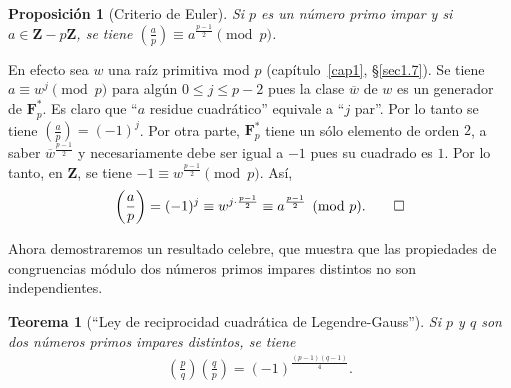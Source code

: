 \documentclass[bibtotoc,leqno,spanish]{amsbook}
\newcommand{\ZZ}{\mathbf{Z}}
\newcommand{\FF}{\mathbf{F}}
\newcommand{\oline}[1]{\overline{#1}}
\newcommand{\leg}[2]{\left(\frac{#1}{#2}\right)}
\numberwithin{equation}{section}
\theoremstyle{note}
\theoremstyle{note}
\newtheorem{theorem}{Teorema}
\newtheorem{proposition}{Proposici\'on}
\theoremstyle{rem}
\numberwithin{theorem}{section}
\numberwithin{proposition}{section}
\numberwithin{definition}{section}
\numberwithin{lemma}{section}
\numberwithin{corollary}{section}
\numberwithin{example}{section}
\numberwithin{footnote}{section}%
\begin{document}
\begin{proposition}[Criterio de Euler]\label{prop5.5.1}
Si $p$ es un n\'umero primo impar y si $a\in\ZZ-p\ZZ$, se tiene $\leg{a}{p}\equiv a^{\frac{p-1}{2}}\pmod p$.
\end{proposition}

En efecto sea $w$ una ra\'iz primitiva mod $p$ (cap\'itulo~\ref{cap1}, \S\ref{sec1.7}). Se tiene
$a\equiv w^{j}\pmod p$ para alg\'un $0\leq j\leq p-2$ pues la clase $\oline w$ de $w$ es un generador
de $\FF_{p}^{*}$. Es claro que ``$a$ residue cuadr\'atico'' equivale a ``$j$ par''. Por lo tanto se tiene
$\leg{a}{p}=(-1)^{j}$. Por otra parte, $\FF_{p}^{*}$ tiene un s\'olo elemento de orden $2$, a saber
$\oline w^{\frac{p-1}{2}}$ y necesariamente debe ser igual a $-1$ pues su cuadrado es $1$. Por lo tanto,
en $\ZZ$, se tiene $-1\equiv w^{\frac{p-1}{2}}\pmod p$. As\'i,
\begin{gather*}
\leg{a}{p}=(-1)^{j}\equiv w^{j\cdot\frac{p-1}{2}}\equiv a^{\frac{p-1}{2}}\pmod p.\qedhere
\end{gather*}

Ahora demostraremos un resultado celebre, que muestra que las propiedades de congruencias m\'odulo dos
n\'umeros primos impares distintos no son independientes.

\begin{theorem}[``Ley de reciprocidad cuadr\'atica de Legendre-Gauss'']\label{teo5.5.1}
Si $p$ y $q$ son dos n\'umeros primos impares distintos, se tiene
\begin{gather*}
\leg{p}{q}\leg{q}{p}=(-1)^{\frac{(p-1)(q-1)}{4}}.
\end{gather*}
\end{theorem}
\end{document}
